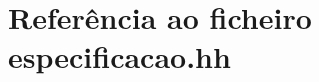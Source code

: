 \hypertarget{especificacao_8hh}{\section{\-Referência ao ficheiro especificacao.\-hh}
\label{especificacao_8hh}
}

